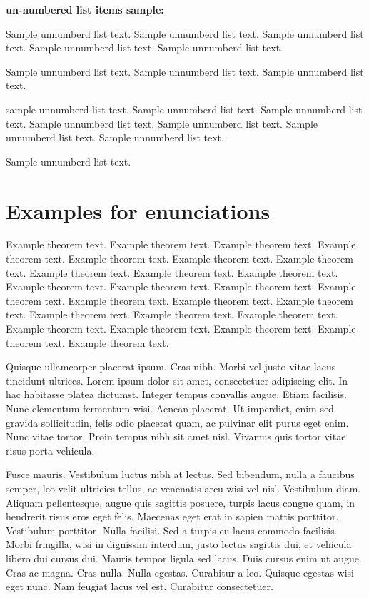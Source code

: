 \documentclass[CJCE,STIX2COL]{WileyNJD-v2}
\begin{document}
\noindent\textbf{un-numbered list items sample:}

\begin{unenumerate}
\item Sample unnumberd list text. Sample unnumberd list text. Sample unnumberd list text. Sample unnumberd list text. Sample unnumberd list text.
\item Sample unnumberd list text. Sample unnumberd list text. Sample unnumberd list text.
\item sample unnumberd list text. Sample unnumberd list text. Sample unnumberd list text. Sample unnumberd list text. Sample unnumberd list text. Sample unnumberd list text. Sample unnumberd list text.
\item Sample unnumberd list text.
\end{unenumerate}

\section{Examples for enunciations}\label{sec4}

\begin{theorem}\label{thm1}
Example theorem text. Example theorem text. Example theorem text. Example theorem text. Example theorem text. Example theorem text. Example theorem text. Example theorem text. Example theorem text. Example theorem text. Example theorem text. Example theorem text. Example theorem text. Example theorem text. Example theorem text. Example theorem text. Example theorem text. Example theorem text. Example theorem text. Example theorem text. Example theorem text. Example theorem text. Example theorem text. Example theorem text. Example theorem text. 
\end{theorem}

Quisque ullamcorper placerat ipsum. Cras nibh. Morbi vel justo vitae lacus tincidunt ultrices. Lorem ipsum dolor sit
amet, consectetuer adipiscing elit. In hac habitasse platea dictumst. Integer tempus convallis augue. Etiam facilisis.
Nunc elementum fermentum wisi. Aenean placerat. Ut imperdiet, enim sed gravida sollicitudin, felis odio placerat
quam, ac pulvinar elit purus eget enim. Nunc vitae tortor. Proin tempus nibh sit amet nisl. Vivamus quis tortor
vitae risus porta vehicula.

Fusce mauris. Vestibulum luctus nibh at lectus. Sed bibendum, nulla a faucibus semper, leo velit ultricies tellus, ac
venenatis arcu wisi vel nisl. Vestibulum diam. Aliquam pellentesque, augue quis sagittis posuere, turpis lacus congue
quam, in hendrerit risus eros eget felis. Maecenas eget erat in sapien mattis porttitor. Vestibulum porttitor. Nulla
facilisi. Sed a turpis eu lacus commodo facilisis. Morbi fringilla, wisi in dignissim interdum, justo lectus sagittis dui, et
vehicula libero dui cursus dui. Mauris tempor ligula sed lacus. Duis cursus enim ut augue. Cras ac magna. Cras nulla.
Nulla egestas. Curabitur a leo. Quisque egestas wisi eget nunc. Nam feugiat lacus vel est. Curabitur consectetuer.
\end{document}
